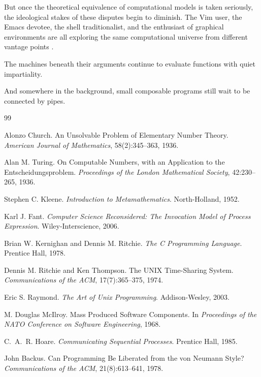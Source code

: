 \documentclass[11pt]{article}
\theoremstyle{definition}
\begin{document}
But once the theoretical equivalence of computational models is taken
seriously, the ideological stakes of these disputes begin to diminish.
The Vim user, the Emacs devotee, the shell traditionalist, and the
enthusiast of graphical environments are all exploring the same
computational universe from different vantage points \cite{raymond2003}.

The machines beneath their arguments continue to evaluate functions with
quiet impartiality.

And somewhere in the background, small composable programs still wait to
be connected by pipes.

\newpage
\begin{thebibliography}{99}

Alonzo Church.
\newblock An Unsolvable Problem of Elementary Number Theory.
\newblock \emph{American Journal of Mathematics}, 58(2):345--363, 1936.

Alan M. Turing.
\newblock On Computable Numbers, with an Application to the Entscheidungsproblem.
\newblock \emph{Proceedings of the London Mathematical Society}, 42:230--265,
  1936.

Stephen C. Kleene.
\newblock \emph{Introduction to Metamathematics}.
\newblock North-Holland, 1952.

Karl J. Fant.
\newblock \emph{Computer Science Reconsidered: The Invocation Model of Process
  Expression}.
\newblock Wiley-Interscience, 2006.

Brian W. Kernighan and Dennis M. Ritchie.
\newblock \emph{The C Programming Language}.
\newblock Prentice Hall, 1978.

Dennis M. Ritchie and Ken Thompson.
\newblock The UNIX Time-Sharing System.
\newblock \emph{Communications of the ACM}, 17(7):365--375, 1974.

Eric S. Raymond.
\newblock \emph{The Art of Unix Programming}.
\newblock Addison-Wesley, 2003.

M. Douglas McIlroy.
\newblock Mass Produced Software Components.
\newblock In \emph{Proceedings of the NATO Conference on Software Engineering},
  1968.

C.\ A.\ R. Hoare.
\newblock \emph{Communicating Sequential Processes}.
\newblock Prentice Hall, 1985.

John Backus.
\newblock Can Programming Be Liberated from the von Neumann Style?
\newblock \emph{Communications of the ACM}, 21(8):613--641, 1978.


\end{thebibliography}
\end{document}
